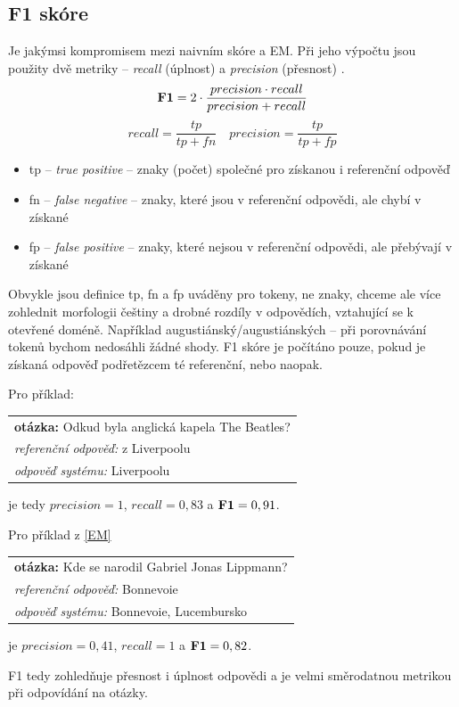 \subsection{F1 skóre}
Je jakýmsi kompromisem mezi naivním skóre a EM. Při jeho výpočtu jsou použity dvě metriky -- \emph{recall} (úplnost) a \emph{precision} (přesnost) \cite{information_retrieval}.
\begin{equation}
    \text{\textbf{F1}} = 2\cdot \frac{precision \cdot recall}{precision + recall} 
\end{equation}
\begin{equation}
recall = \frac{tp}{tp+fn} \quad precision = \frac{tp}{tp+fp}
\end{equation}

\begin{itemize}
    \item tp -- \emph{true positive} -- znaky (počet) společné pro získanou i referenční odpověď
    \item fn -- \emph{false negative} -- znaky, které jsou v referenční odpovědi, ale chybí v získané
    \item fp -- \emph{false positive} -- znaky, které nejsou v referenční odpovědi, ale přebývají v získané
\end{itemize}

Obvykle jsou definice tp, fn a fp uváděny pro tokeny, ne znaky, chceme ale více zohlednit morfologii češtiny a drobné rozdíly v odpovědích, vztahující se k otevřené doméně. Například augustiánský/augustiánských -- při porovnávání tokenů bychom nedosáhli žádné shody. F1 skóre je počítáno pouze, pokud je získaná odpověď podřetězcem té referenční, nebo naopak.\par \medskip
\noindent Pro příklad: 
\begin{center}
\begin{tabular}{l}
    \textbf{otázka:} Odkud byla anglická kapela The Beatles?\\
    \emph{referenční odpověď:} z Liverpoolu\\
    \emph{odpověď systému:} Liverpoolu\\
\end{tabular}
\end{center}
je tedy $precision = 1$, $recall = 0,83$ a $\text{\textbf{F1}} = 0,91$.\par \medskip
\noindent Pro příklad z \ref{EM}
\begin{center}
\begin{tabular}{l}
    \textbf{otázka:} Kde se narodil Gabriel Jonas Lippmann?\\
    \emph{referenční odpověď:} Bonnevoie\\
    \emph{odpověď systému:} Bonnevoie, Lucembursko\\
\end{tabular}
\end{center}
je $precision = 0,41$, $recall = 1$ a $\text{\textbf{F1}} = 0,82$.\par \medskip
F1 tedy zohledňuje přesnost i úplnost odpovědi a je velmi směrodatnou metrikou při odpovídání na otázky.

